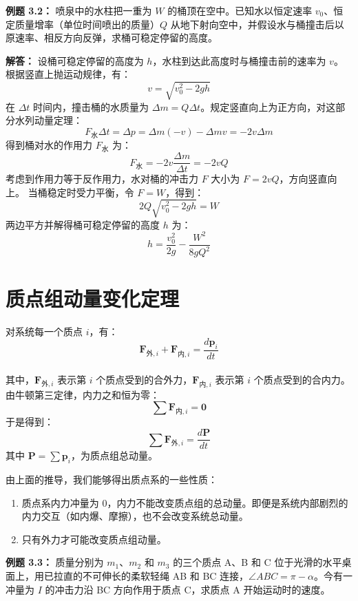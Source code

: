 	\vspace{1em}
	\noindent\textbf{例题 3.2：} 喷泉中的水柱把一重为 $W$ 的桶顶在空中。已知水以恒定速率 $v_0$、恒定质量增率（单位时间喷出的质量）$Q$ 从地下射向空中，并假设水与桶撞击后以原速率、相反方向反弹，求桶可稳定停留的高度。
	
	\noindent\textbf{解答：}
	设桶可稳定停留的高度为 $h$，水柱到达此高度时与桶撞击前的速率为 $v$。根据竖直上抛运动规律，有：
	\[ v = \sqrt{v_0^2 - 2gh} \]
	在 $\Delta t$ 时间内，撞击桶的水质量为 $\Delta m = Q \Delta t$。规定竖直向上为正方向，对这部分水列动量定理：
	\[ F_{\text{水}} \Delta t = \Delta p = \Delta m (-v) - \Delta m v = -2v \Delta m \]
	得到桶对水的作用力 $F_{\text{水}}$ 为：
	\[ F_{\text{水}} = -2v \frac{\Delta m}{\Delta t} = -2vQ \]
	考虑到作用力等于反作用力，水对桶的冲击力 $F$ 大小为 $F = 2vQ$，方向竖直向上。
	当桶稳定时受力平衡，令 $F = W$，得到：
	\[ 2Q\sqrt{v_0^2 - 2gh} = W \]
	两边平方并解得桶可稳定停留的高度 $h$ 为：
	\[ h = \frac{v_0^2}{2g} - \frac{W^2}{8gQ^2} \]
	
	\vspace{1em}
	\section{质点组动量变化定理}
	\noindent 对系统每一个质点 $i$，有：
	\[ \boldsymbol{F}_{\text{外},i} + \boldsymbol{F}_{\text{内},i} = \frac{d\boldsymbol{p}_i}{dt} \]
	\\其中，$\boldsymbol{F}_{\text{外},i}$ 表示第 $i$ 个质点受到的合外力，$\boldsymbol{F}_{\text{内},i}$ 表示第 $i$ 个质点受到的合内力。
	\\
	\noindent 由牛顿第三定律，内力之和恒为零：
	\[ \sum \boldsymbol{F}_{\text{内},i} = \boldsymbol{0} \]
	于是得到：
	\[ \boxed{\sum \boldsymbol{F}_{\text{外},i} = \frac{d\boldsymbol{P}}{dt}} \]
	其中 $\boldsymbol{P} = \sum \boldsymbol{p}_i$，为质点组总动量。
	
	由上面的推导，我们能够得出质点系的一些性质：
	\begin{enumerate}
		\item 质点系内力冲量为 0，内力不能改变质点组的总动量。即便是系统内部剧烈的内力交互（如内爆、摩擦），也不会改变系统总动量。
		\item 只有外力才可能改变质点组动量。
	\end{enumerate}
	
	\noindent\textbf{例题 3.3：} 质量分别为 $m_1$、$m_2$ 和 $m_3$ 的三个质点 A、B 和 C 位于光滑的水平桌面上，用已拉直的不可伸长的柔软轻绳 AB 和 BC 连接，$\angle ABC = \pi - \alpha$。今有一冲量为 $I$ 的冲击力沿 BC 方向作用于质点 C，求质点 A 开始运动时的速度。
	
